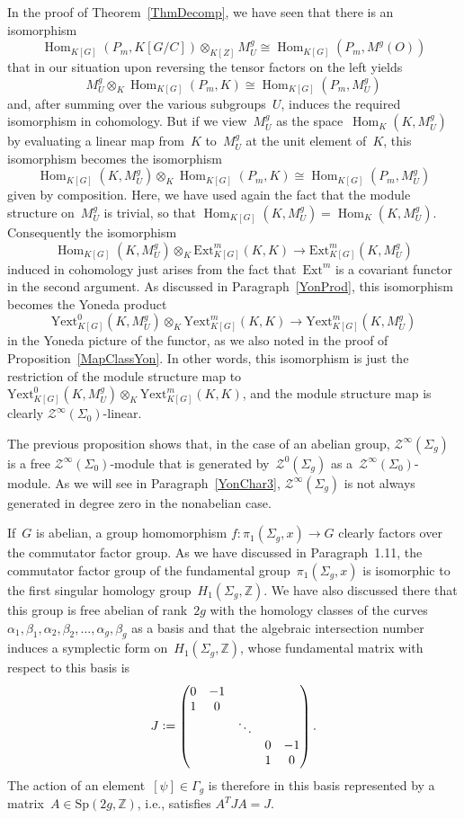 \documentclass[12pt]{article}
\makeatletter
\newcounter{num}
\theoremstyle{definition}
\theoremstyle{break}
\renewenvironment{proof}[1][\proofname]{\par
\vspace{-5pt}%
\pushQED{\qed}%
\normalfont
\topsep0pt \partopsep0pt %
\trivlist
\item[\hskip\labelsep
\bfseries
#1\@addpunct{.}]\ignorespaces
}{%
\popQED\endtrivlist\@endpefalse
\addvspace{6pt plus 6pt} %
}
\newcommand{\Z}{\mathbb{Z}}
\DeclareMathOperator\Hom{Hom}
\newcommand{\Sp}{\mathrm{Sp}}
\newcommand{\Ext}{\mathrm{Ext}}
\newcommand{\Yext}{\mathrm{Yext}}
\renewcommand{\1}{\mathbbm{1}}
\newcommand{\TFT}{\mathcal{Z}}
\newcommand{\ot}{\mathbin{\otimes}}
\newcommand{\deq}{\vcentcolon =}
\makeatother
\begin{document}
\begin{proof}
In the proof of Theorem~\ref{ThmDecomp}, we have seen that there is an isomorphism
\[\Hom_{K[G]}(P_m, K[G/C]) \ot_{K[Z]} M_U^{g} \cong \Hom_{K[G]}(P_m, M^g(O))\]
that in our situation upon reversing the tensor factors on the left yields
\[M_U^{g} \ot_{K} \Hom_{K[G]}(P_m, K)  \cong \Hom_{K[G]}(P_m, M_U^{g})\]
and, after summing over the various subgroups~$U$, induces the required isomorphism in cohomology. But if we view~$M_U^{g}$ as the space~$\Hom_K(K,M_U^{g})$ by evaluating a linear map from~$K$ to~$M_U^{g}$ at the unit element of~$K$, this isomorphism becomes the isomorphism
\[\Hom_{K[G]}(K,M_U^{g}) \ot_K \Hom_{K[G]}(P_m,K) \cong \Hom_{K[G]}(P_m,M_U^{g})\]
given by composition. Here, we have used again the fact that the module structure on~$M_U^{g}$ is trivial, so that $\Hom_{K[G]}(K,M_U^{g}) = \Hom_{K}(K,M_U^{g})$. Consequently the isomorphism
\[\Hom_{K[G]}(K,M_U^{g}) \ot_K \Ext^m_{K[G]}(K,K) \to \Ext^m_{K[G]}(K,M_U^{g})\]
induced in cohomology just arises from the fact that~$\Ext^m$ is a covariant functor in the second argument. As discussed in Paragraph~\ref{YonProd}, this isomorphism becomes the Yoneda product
\[\Yext^0_{K[G]}(K,M_U^{g}) \ot_K \Yext^m_{K[G]}(K,K) \to \Yext^m_{K[G]}(K,M_U^{g})\]
in the Yoneda picture of the functor, as we also noted in the proof of Proposition~\ref{MapClassYon}. In other words, this isomorphism is just the restriction of the module structure map to $\Yext^0_{K[G]}(K,M_U^{g}) \ot_K \Yext^m_{K[G]}(K,K)$, and the module structure map is clearly $\TFT^\infty(\Sigma_0)$-linear.
\end{proof}

The previous proposition shows that, in the case of an abelian group, $\TFT^\infty(\Sigma_g)$ is a free $\TFT^\infty(\Sigma_0)$-module that is generated by~$\TFT^0(\Sigma_g)$ as a~$\TFT^\infty(\Sigma_0)$-module. As we will see in Paragraph~\ref{YonChar3}, $\TFT^\infty(\Sigma_g)$ is not always generated in degree zero in the nonabelian case.

If~$G$ is abelian, a group homomorphism $f \colon \pi_1(\Sigma_g,x) \to G$ clearly factors over the commutator factor group. As we have discussed in Paragraph~1.11, the commutator factor group of the fundamental group~$\pi_1(\Sigma_g,x)$ is isomorphic to the first singular homology group~$H_1(\Sigma_g, \Z)$. We have also discussed there that this group is free abelian of rank~$2g$ with the homology classes of the curves $\alpha_1, \beta_1, \alpha_2, \beta_2,  \ldots, \alpha_g, \beta_g$ as a basis and that the algebraic intersection number induces a symplectic form on~$H_1(\Sigma_g, \Z)$, whose fundamental matrix with respect to this basis is
\[J \deq \begin{pmatrix}
0 & -1 &  &  & \\
1 & 0 &  &  & \\
& & \ddots & &\\
& & & 0 & -1\\
& & & 1 & 0\\
\end{pmatrix}.\]
The action of an element~$[\psi] \in \Gamma_g$ is therefore in this basis represented by a matrix~$A \in \Sp(2g, \Z)$, i.e., satisfies $A^T J A = J$.
\end{document}
